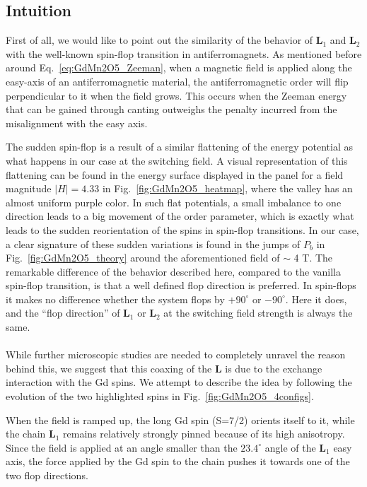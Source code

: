 \subsection{Intuition}
First of all, we would like to point out the similarity of the behavior of $\bm L_1$ and $\bm L_2$ with the well-known spin-flop transition in antiferromagnets.
As mentioned before around Eq.~\eqref{eq:GdMn2O5_Zeeman}, when a magnetic field is applied along the easy-axis of an antiferromagnetic material, the antiferromagnetic order will flip perpendicular to it when the field grows.
This occurs when the Zeeman energy that can be gained through canting outweighs the penalty incurred from the misalignment with the easy axis.

The sudden spin-flop is a result of a similar flattening of the energy potential as what happens in our case at the switching field. A visual representation of this flattening can be found in the energy surface displayed in the panel for a field magnitude $|H| = 4.33$ in Fig.~\ref{fig:GdMn2O5_heatmap}, where the valley has an almost uniform purple color.
In such flat potentials, a small imbalance to one direction leads to a big movement of the order parameter, which is exactly what leads to the sudden reorientation of the spins in spin-flop transitions.
In our case, a clear signature of these sudden variations is found in the jumps of $P_b$ in Fig.~\ref{fig:GdMn2O5_theory} around the aforementioned field of $\sim$ 4 T.
The remarkable difference of the behavior described here, compared to the vanilla spin-flop transition, is that a well defined flop direction is preferred. In spin-flops it makes no difference whether the system flops by $+90^\circ$ or $-90^\circ$. Here it does, and the ``flop direction'' of $\bm L_1$ or $\bm L_2$ at the switching field strength is always the same.
\\\\
While further microscopic studies are needed to completely unravel the reason behind this, we suggest that this coaxing of the $\bm L$ is due to the exchange interaction with the Gd spins. We attempt to describe the idea by following the evolution of the two highlighted spins in Fig.~\ref{fig:GdMn2O5_4configs}.

When the field is ramped up, the long Gd spin (S=7/2) orients itself to it, while the chain $\bm L_1$ remains relatively strongly pinned because of its high anisotropy.
Since the field is applied at an angle smaller than the $23.4^\circ$ angle of the $\bm L_1$ easy axis, the force applied by the Gd spin to the chain pushes it towards one of the two flop directions.

